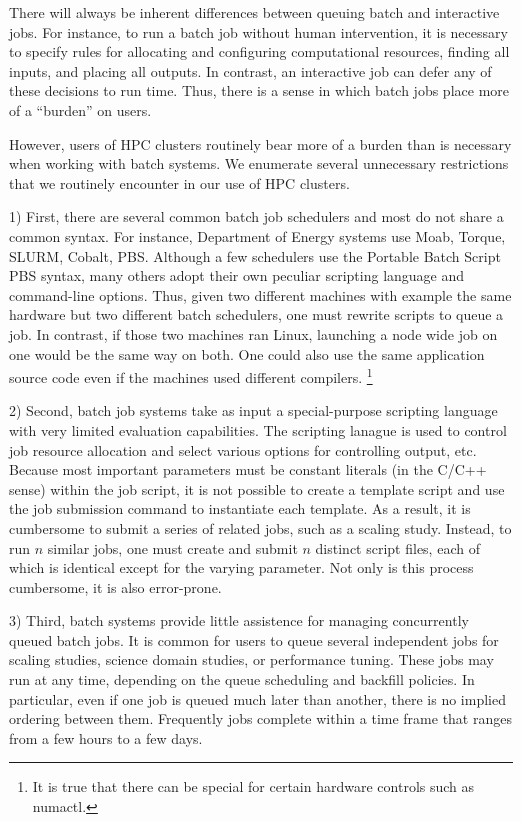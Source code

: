 There will always be inherent differences between queuing batch and interactive jobs.
For instance, to run a batch job without human intervention, it is necessary to specify rules for allocating and configuring computational resources, finding all inputs, and placing all outputs.
In contrast, an interactive job can defer any of these decisions to run time.
Thus, there is a sense in which batch jobs place more of a ``burden'' on users.

However, users of HPC clusters routinely bear more of a burden than is necessary when working with batch systems.
We enumerate several unnecessary restrictions that we routinely encounter in our use of HPC clusters.

1) First, there are several common batch job schedulers and most do not share a common syntax.
For instance, Department of Energy systems use Moab, Torque, SLURM, Cobalt, PBS.
Although a few schedulers use the Portable Batch Script PBS syntax, many others adopt their own peculiar scripting language and command-line options.
Thus, given two different machines with example the same hardware but two different batch schedulers, one must rewrite scripts to queue a job.
In contrast, if those two machines ran Linux, launching a node wide job on one would be the same way on both.
One could also use the same application source code even if the machines used different compilers.
\footnote{It is true that there can be special for certain hardware controls such as numactl.}

2) Second, batch job systems take as input a special-purpose scripting language with very limited evaluation capabilities.
The scripting lanague is used to control job resource allocation and select various options for controlling output, etc.
Because most important parameters must be constant literals (in the C/C++ sense) within the job script, it is not possible to create a template script and use the job submission command to instantiate each template.
As a result, it is cumbersome to submit a series of related jobs, such as a scaling study.
Instead, to run $n$ similar jobs, one must create and submit $n$ distinct script files, each of which is identical except for the varying parameter.
Not only is this process cumbersome, it is also error-prone.


3) Third, batch systems provide little assistence for managing concurrently queued batch jobs.
It is common for users to queue several independent jobs for scaling studies, science domain studies, or performance tuning.
These jobs may run at any time, depending on the queue scheduling and backfill policies.
In particular, even if one job is queued much later than another, there is no implied ordering between them.
Frequently jobs complete within a time frame that ranges from a few hours to a few days.

